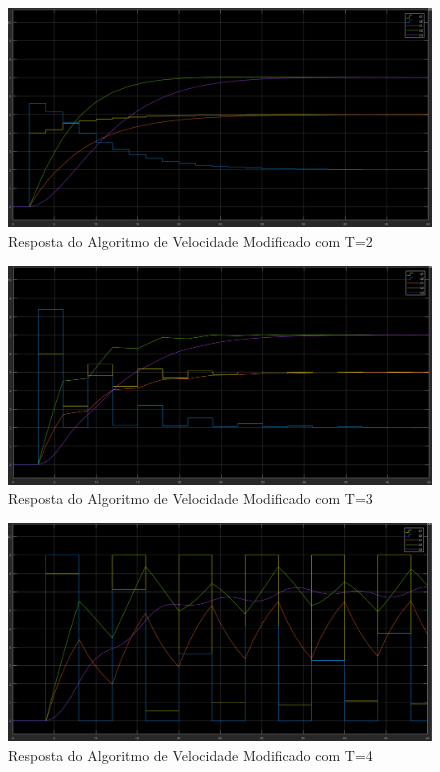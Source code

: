 \documentclass[11pt]{article}
\begin{document}
\begin{figure}[!htbp]
	\centering
      		 \includegraphics[page=1,width=1\textwidth]{img/t2.png} 
		\caption{Resposta do Algoritmo de Velocidade Modificado com T=2}	
	\label{t2}
\end{figure}

\begin{figure}[!htbp]
	\centering
      		 \includegraphics[page=1,width=1\textwidth]{img/t3.png} 
		\caption{Resposta do Algoritmo de Velocidade Modificado com T=3}	
	\label{t3}
\end{figure}


\begin{figure}[!htbp]
	\centering
      		 \includegraphics[page=1,width=1\textwidth]{img/t4.png} 
		\caption{Resposta do Algoritmo de Velocidade Modificado com T=4}	
	\label{t4}
\end{figure}
\newpage
\end{document}
